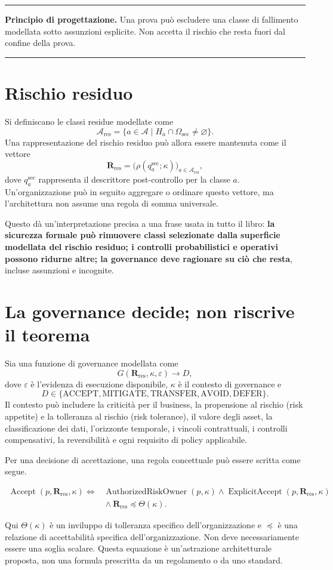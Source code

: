 \documentclass[10pt,oneside,openany]{book}
\newcommand{\principle}[1]{%
  \vspace{4pt}
  \noindent\begin{minipage}{\linewidth}
  \hrule\vspace{5pt}
  \small\sffamily\raggedright\textbf{Principio di progettazione.} #1
  \vspace{5pt}\hrule
  \end{minipage}\vspace{4pt}
}
\begin{document}
\principle{Una prova può escludere una classe di fallimento modellata sotto assunzioni esplicite. Non accetta il rischio che resta fuori dal confine della prova.}

\section{Rischio residuo}

Si definiscano le classi residue modellate come
\[
\mathcal{A}_{\mathrm{res}}=\{a\in\mathcal{A}\mid H_a\cap\Omega_{\mathrm{sec}}\neq\varnothing\}.
\]
Una rappresentazione del rischio residuo può allora essere mantenuta come il vettore
\[
\mathbf{R}_{\mathrm{res}}=\bigl(\rho(q_a^{\mathrm{sec}};\kappa)\bigr)_{a\in\mathcal{A}_{\mathrm{res}}},
\]
dove $q_a^{\mathrm{sec}}$ rappresenta il descrittore post-controllo per la classe $a$. Un'organizzazione può in seguito aggregare o ordinare questo vettore, ma l'architettura non assume una regola di somma universale.

Questo dà un'interpretazione precisa a una frase usata in tutto il libro: \textbf{la sicurezza formale può rimuovere classi selezionate dalla superficie modellata del rischio residuo; i controlli probabilistici e operativi possono ridurne altre; la governance deve ragionare su ciò che resta}, incluse assunzioni e incognite.

\section{La governance decide; non riscrive il teorema}

Sia una funzione di governance modellata come
\[
G(\mathbf{R}_{\mathrm{res}},\kappa,\varepsilon)\rightarrow D,
\]
dove $\varepsilon$ è l'evidenza di esecuzione disponibile, $\kappa$ è il contesto di governance e
\[
D\in\{\mathrm{ACCEPT},\mathrm{MITIGATE},\mathrm{TRANSFER},\mathrm{AVOID},\mathrm{DEFER}\}.
\]
Il contesto può includere la criticità per il business, la propensione al rischio (risk appetite) e la tolleranza al rischio (risk tolerance), il valore degli asset, la classificazione dei dati, l'orizzonte temporale, i vincoli contrattuali, i controlli compensativi, la reversibilità e ogni requisito di policy applicabile.

Per una decisione di accettazione, una regola concettuale può essere scritta come segue.
\begin{formulabox}
\[
\begin{aligned}
\operatorname{Accept}(p,\mathbf{R}_{\mathrm{res}},\kappa)\iff{}&
\operatorname{AuthorizedRiskOwner}(p,\kappa)\land\operatorname{ExplicitAccept}(p,\mathbf{R}_{\mathrm{res}},\kappa)\\
&{}\land\mathbf{R}_{\mathrm{res}}\preceq\Theta(\kappa).
\end{aligned}
\]
\end{formulabox}
Qui $\Theta(\kappa)$ è un inviluppo di tolleranza specifico dell'organizzazione e $\preceq$ è una relazione di accettabilità specifica dell'organizzazione. Non deve necessariamente essere una soglia scalare. Questa equazione è un'astrazione architetturale proposta, non una formula prescritta da un regolamento o da uno standard.
\end{document}
